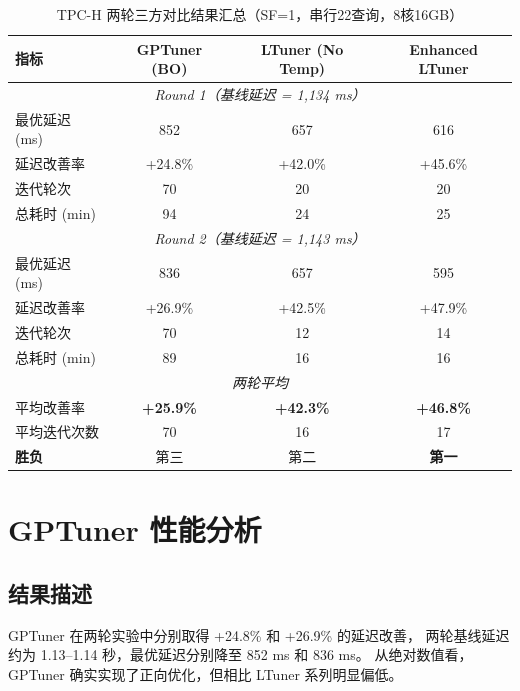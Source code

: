 \begin{table}[h]
\centering
\caption{TPC-H 两轮三方对比结果汇总（SF=1，串行22查询，8核16GB）}
\label{tab:tpch-results}
\begin{tabular}{l|ccc}
\hline
\textbf{指标} & \textbf{GPTuner (BO)} & \textbf{LTuner (No Temp)} & \textbf{Enhanced LTuner} \\
\hline
\multicolumn{4}{c}{\textit{Round 1（基线延迟 = 1,134 ms）}} \\
\hline
最优延迟 (ms)   & 852  & 657  & 616  \\
延迟改善率       & +24.8\% & +42.0\% & +45.6\% \\
迭代轮次         & 70   & 20   & 20   \\
总耗时 (min)     & 94   & 24   & 25   \\
\hline
\multicolumn{4}{c}{\textit{Round 2（基线延迟 = 1,143 ms）}} \\
\hline
最优延迟 (ms)   & 836  & 657  & 595  \\
延迟改善率       & +26.9\% & +42.5\% & +47.9\% \\
迭代轮次         & 70   & 12   & 14   \\
总耗时 (min)     & 89   & 16   & 16   \\
\hline
\multicolumn{4}{c}{\textit{两轮平均}} \\
\hline
平均改善率       & \textbf{+25.9\%} & \textbf{+42.3\%} & \textbf{+46.8\%} \\
平均迭代次数     & 70   & 16   & 17   \\
\hline
\textbf{胜负}   & 第三 & 第二 & \textbf{第一} \\
\hline
\end{tabular}
\end{table}



\section{GPTuner 性能分析}

\subsection{结果描述}

GPTuner 在两轮实验中分别取得 +24.8\% 和 +26.9\% 的延迟改善，
两轮基线延迟约为 1.13--1.14 秒，最优延迟分别降至 852 ms 和 836 ms。
从绝对数值看，GPTuner 确实实现了正向优化，但相比 LTuner 系列明显偏低。

